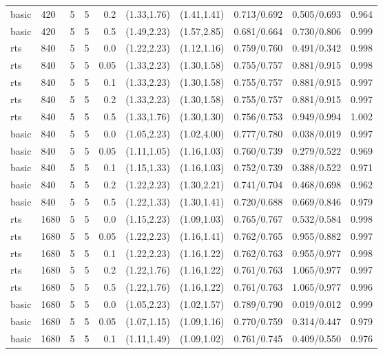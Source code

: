 \begin{tabular}{llrrrccccc}
basic & 420 & 5 & 5 & 0.2 & (1.33,1.76) & (1.41,1.41) & 0.713/0.692 & 0.505/0.693 & 0.964 \\
basic & 420 & 5 & 5 & 0.5 & (1.49,2.23) & (1.57,2.85) & 0.681/0.664 & 0.730/0.806 & 0.999 \\
rts & 840 & 5 & 5 & 0.0 & (1.22,2.23) & (1.12,1.16) & 0.759/0.760 & 0.491/0.342 & 0.998 \\
rts & 840 & 5 & 5 & 0.05 & (1.33,2.23) & (1.30,1.58) & 0.755/0.757 & 0.881/0.915 & 0.998 \\
rts & 840 & 5 & 5 & 0.1 & (1.33,2.23) & (1.30,1.58) & 0.755/0.757 & 0.881/0.915 & 0.997 \\
rts & 840 & 5 & 5 & 0.2 & (1.33,2.23) & (1.30,1.58) & 0.755/0.757 & 0.881/0.915 & 0.997 \\
rts & 840 & 5 & 5 & 0.5 & (1.33,1.76) & (1.30,1.30) & 0.756/0.753 & 0.949/0.994 & 1.002 \\
basic & 840 & 5 & 5 & 0.0 & (1.05,2.23) & (1.02,4.00) & 0.777/0.780 & 0.038/0.019 & 0.997 \\
basic & 840 & 5 & 5 & 0.05 & (1.11,1.05) & (1.16,1.03) & 0.760/0.739 & 0.279/0.522 & 0.969 \\
basic & 840 & 5 & 5 & 0.1 & (1.15,1.33) & (1.16,1.03) & 0.752/0.739 & 0.388/0.522 & 0.971 \\
basic & 840 & 5 & 5 & 0.2 & (1.22,2.23) & (1.30,2.21) & 0.741/0.704 & 0.468/0.698 & 0.962 \\
basic & 840 & 5 & 5 & 0.5 & (1.22,1.33) & (1.30,1.41) & 0.720/0.688 & 0.669/0.846 & 0.979 \\
rts & 1680 & 5 & 5 & 0.0 & (1.15,2.23) & (1.09,1.03) & 0.765/0.767 & 0.532/0.584 & 0.998 \\
rts & 1680 & 5 & 5 & 0.05 & (1.22,2.23) & (1.16,1.41) & 0.762/0.765 & 0.955/0.882 & 0.997 \\
rts & 1680 & 5 & 5 & 0.1 & (1.22,2.23) & (1.16,1.22) & 0.762/0.763 & 0.955/0.977 & 0.998 \\
rts & 1680 & 5 & 5 & 0.2 & (1.22,1.76) & (1.16,1.22) & 0.761/0.763 & 1.065/0.977 & 0.997 \\
rts & 1680 & 5 & 5 & 0.5 & (1.22,1.76) & (1.16,1.22) & 0.761/0.763 & 1.065/0.977 & 0.996 \\
basic & 1680 & 5 & 5 & 0.0 & (1.05,2.23) & (1.02,1.57) & 0.789/0.790 & 0.019/0.012 & 0.999 \\
basic & 1680 & 5 & 5 & 0.05 & (1.07,1.15) & (1.09,1.16) & 0.770/0.759 & 0.314/0.447 & 0.979 \\
basic & 1680 & 5 & 5 & 0.1 & (1.11,1.49) & (1.09,1.02) & 0.761/0.745 & 0.409/0.550 & 0.976 \\

\end{tabular}
